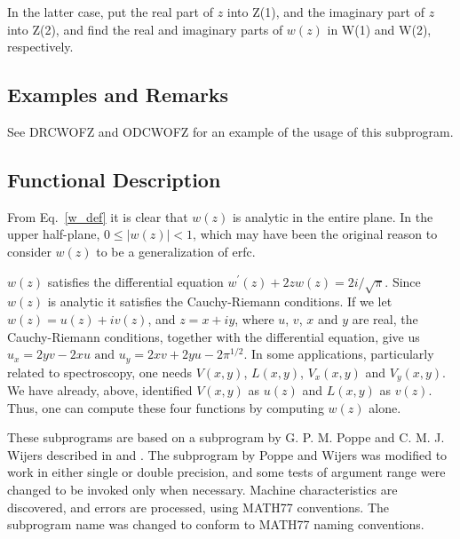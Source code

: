 \documentclass[twoside]{MATH77}
\begin{document}
In the latter case, put the real part of $z$ into Z(1), and the imaginary
part of $z$ into Z(2), and find the real and imaginary parts of $w(z)$ in
W(1) and W(2), respectively.

\subsection{Examples and Remarks}

See DRCWOFZ and ODCWOFZ for an example of the usage of this subprogram.

\subsection{Functional Description}

From Eq.~\eqref{w_def} it is clear that $w(z)$ is analytic in the entire
plane.  In the upper half-plane, $0 \leq |w(z)| < 1$, which may have been
the original reason to consider $w(z)$ to be a generalization of erfc.

$w(z)$ satisfies the differential equation $w^{\prime}(z) + 2zw(z) = 2i/%
\sqrt{\pi }$.  Since $w(z)$ is analytic it satisfies the Cauchy-Riemann
conditions.  If we let $w(z) = u(z) + iv(z)$, and $z = x + iy$, where $u$,
$v$, $x$ and $y$ are real, the Cauchy-Riemann conditions, together with
the differential equation, give us $u_x = 2yv - 2xu \text{ and } u_y = 2xv
+ 2yu - 2\pi ^{1/2} $.  In some applications, particularly related to
spectroscopy, one needs $V(x,y)$, $L(x,y)$, $V_x(x,y)$ and $V_y(x,y)$.  We
have already, above, identified $V(x,y)$ as $u(z)$ and $L(x,y)$ as $v(z)$.
Thus, one can compute these four functions by computing $w(z)$ alone.

These subprograms are based on a subprogram by G. P. M. Poppe and C. M. J.
Wijers described in \cite{Poppe:1990:MEC} and \cite{Poppe:1990:AEC}. The subprogram by Poppe and
Wijers was modified to work in either single or double precision, and some
tests of argument range were changed to be invoked only when necessary.
Machine characteristics are discovered, and errors are processed, using
MATH77 conventions. The subprogram name was changed to conform to
MATH77 naming conventions.
\end{document}
